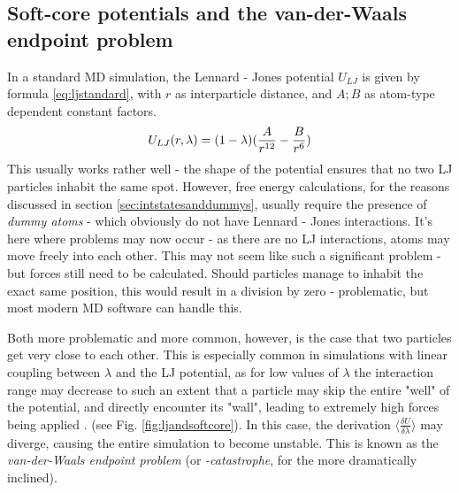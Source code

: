 \documentclass[oneside]{scrreprt}
\begin{document}
\subsection{Soft-core potentials and the van-der-Waals endpoint problem} \label{sec:vdwproblem}
In a standard MD simulation, the Lennard - Jones potential $U_{LJ}$ is given by formula \ref{eq:ljstandard}, with $r$ as interparticle distance, and $A;B$ as atom-type dependent constant factors.
\begin{equation}
U_{LJ}(r,\lambda)=(1-\lambda)(\frac{A}{r^{12}} - \frac{B}{r^6}) \label{eq:ljstandard} \\
\end{equation}
This usually works rather well -  the shape of the potential ensures that no two LJ particles inhabit the same spot. However, free energy calculations, for the reasons discussed in section \ref{sec:intstatesanddummys}, usually require the presence of \textit{dummy atoms} - which obviously do not have Lennard - Jones interactions. It's here where problems may now occur -  as there are no LJ interactions, atoms may move freely into each other. This may not seem like such a significant problem - but forces still need to be calculated. Should particles manage to inhabit the exact same position, this would result in a division by zero - problematic, but most modern MD software can handle this. 


Both more problematic and more common, however, is the case that two particles get very close to each other. This is especially common in simulations with linear coupling between $\lambda$ and the LJ potential, as for low values of $\lambda$ the interaction range may decrease to such an extent that a particle may skip the entire "well" of the potential, and directly encounter its "wall", leading to extremely high forces being applied \cite{boresch_avoiding_2011}. (see Fig. \ref{fig:ljandsoftcore}). In this case, the derivation $\langle \frac{\delta U}{\delta\lambda} \rangle$ may diverge, causing the entire simulation to become unstable. This is known as the \textit{van-der-Waals endpoint problem} (or \textit{-catastrophe}, for the more dramatically inclined).
\end{document}

